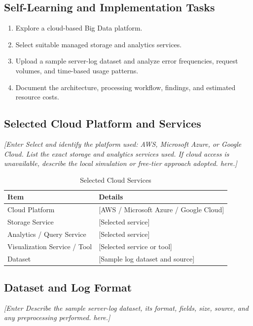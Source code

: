 \documentclass[12pt,a4paper]{report}
\newcommand{\placeholder}[1]{\textit{[Enter #1 here.]}}
\begin{document}
\subsection{Self-Learning and Implementation Tasks}
\begin{enumerate}
    \item Explore a cloud-based Big Data platform.
    \item Select suitable managed storage and analytics services.
    \item Upload a sample server-log dataset and analyze error frequencies,
    request volumes, and time-based usage patterns.
    \item Document the architecture, processing workflow, findings, and
    estimated resource costs.
\end{enumerate}

\subsection{Selected Cloud Platform and Services}
\placeholder{Select and identify the platform used: AWS, Microsoft Azure,
or Google Cloud. List the exact storage and analytics services used.
If cloud access is unavailable, describe the local simulation or free-tier
approach adopted.}

\begin{table}[H]
\centering
\caption{Selected Cloud Services}
\begin{tabularx}{\textwidth}{|l|X|}
\hline
\textbf{Item} & \textbf{Details}\\
\hline
Cloud Platform & [AWS / Microsoft Azure / Google Cloud]\\
\hline
Storage Service & [Selected service]\\
\hline
Analytics / Query Service & [Selected service]\\
\hline
Visualization Service / Tool & [Selected service or tool]\\
\hline
Dataset & [Sample log dataset and source]\\
\hline
\end{tabularx}
\end{table}

\subsection{Dataset and Log Format}
\placeholder{Describe the sample server-log dataset, its format, fields,
size, source, and any preprocessing performed.}
\end{document}
